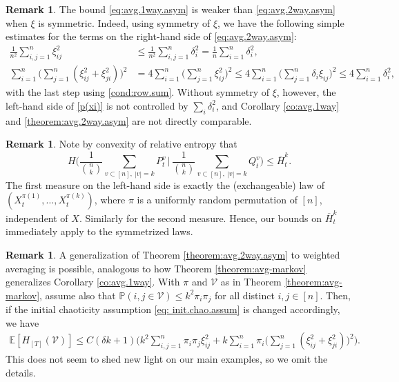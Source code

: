 \documentclass[11pt,reqno]{amsart}
\numberwithin{equation}{section}
\theoremstyle{definition}
\newtheorem{remark}[theorem]{Remark}
\def\E{{\mathbb E}}
\def\PP{{\mathbb P}}
\def\V{{\mathcal V}}
\begin{document}
\begin{remark} \label{rmk:sym}
The bound \eqref{eq:avg.1way.asym} is weaker than \eqref{eq:avg.2way.asym} when $\xi$ is symmetric. Indeed, 
using symmetry of $\xi$, we have the following simple estimates for the terms on the right-hand side of \eqref{eq:avg.2way.asym}:
\begin{align}
\frac{1}{n^2}\sum_{i,j=1}^n\xi_{ij}^2 & \le \frac{1}{n^2}\sum_{i,j=1}^n \delta_i^2 =\frac{1}{n }\sum_{i =1}^n \delta_i^2, \nonumber \\
\sum_{i=1}^n\bigg(\sum_{j=1}^n (\xi_{ij}^2 +\xi_{ji}^2)\bigg)^2  & = 4\sum_{i=1}^n\bigg(\sum_{j=1}^n \xi_{ij}^2\bigg)^2 \le   4\sum_{i=1}^n\bigg(\sum_{j=1}^n\delta_i\xi_{ij}\bigg)^2 \le 4\sum_{i=1}^n \delta_i^2,  \label{p(xi)} 
\end{align}
with the last step using \eqref{cond:row.sum}. Without symmetry of $\xi$, however, the left-hand side of \eqref{p(xi)} is not controlled by $\sum_i \delta_i^2$, and Corollary \ref{co:avg.1way} and \ref{theorem:avg.2way.asym} are not directly comparable.
\end{remark}

\begin{remark}
Note by convexity of relative entropy that 
\begin{equation*}
H\bigg(\frac{1}{{n \choose k}}\sum_{v \subset [n], \ |v|=k} P^v_t \,\bigg|\, \frac{1}{{n \choose k}}\sum_{v \subset [n], \ |v|=k} Q^v_t\bigg) \le \overline{H}^k_t.
\end{equation*}
The first measure on the left-hand side  is exactly the (exchangeable) law of $(X^{\pi(1)}_t,\ldots,X^{\pi(k)}_t)$, where $\pi$ is a uniformly random permutation of $[n]$, independent of $X$. Similarly for the second measure.
Hence, our bounds on $\overline{H}^k_t$ immediately apply to the symmetrized laws.
\end{remark}

\begin{remark}
A generalization of Theorem \ref{theorem:avg.2way.asym} to weighted averaging is possible, analogous to how Theorem \ref{theorem:avg-markov} generalizes Corollary \ref{co:avg.1way}. With $\pi$ and $\V$ as in Theorem \ref{theorem:avg-markov}, assume also that $\PP(i,j \in \V) \le k^2\pi_i\pi_j$ for all distinct $i,j \in [n]$. Then, if the initial chaoticity assumption \eqref{eq: init.chao.assum} is changed accordingly, we have
\begin{align*}
\E[H_{[T]}(\V)] \le C(\delta k + 1)\bigg(k^2 \sum_{i,j=1}^n \pi_i\pi_j \xi_{ij}^2 +  k\sum_{i=1}^n\pi_i\bigg(\sum_{j=1}^n (\xi_{ij}^2 +\xi_{ji}^2)\bigg)^2\bigg).
\end{align*}
This does not seem to shed new light on our main examples, so we omit the details.
\end{remark}
\end{document}
